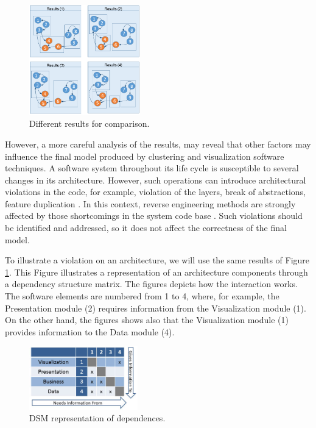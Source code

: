 \documentclass{sig-alternate-05-2015}
\begin{document}
\begin{figure}[!h]
	\centering
	\includegraphics[width=0.43\textwidth]{exemplo_comparacao_modelos_en}
	\caption{Different results for comparison.}
	\label{exemplo_comparacao_modelos}
\end{figure}


However, a more careful analysis of the results, may reveal that other factors may influence the final model produced by clustering and visualization software techniques. A software system throughout its life cycle is susceptible to several changes in its architecture. However, such operations can introduce architectural violations in the code, for example, violation of the layers,  break of abstractions, feature duplication \cite {kazman_view_1998}. In this context, reverse engineering methods are strongly affected by those shortcomings in the system code base \cite {Platenius_2012}.  Such violations should be identified and addressed, so it does not affect the correctness of the final model.

To illustrate a violation on an architecture,  we will use the same results of Figure \ref{exemplo_comparacao_modelos}.  This Figure illustrates a representation of an architecture components through a dependency structure matrix. The figures depicts how the interaction works. The software elements are numbered from 1 to 4, where, for example, the Presentation module (2) requires information from the Visualization module (1). On the other hand, the figures shows also that the Visualization module (1) provides information to the Data module (4).

 \begin{figure}[!h]
 	\centering
 	\includegraphics[width=0.42\textwidth]{3_exemploMatrizViolada_en}
 	\caption{DSM representation	of dependences.}
 	\label{3_exemploMatrizViolada}
 \end{figure}
 
\end{document}
